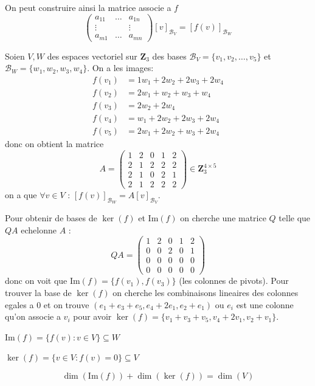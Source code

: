 On peut construire ainsi la matrice associe a $f$
$$
\begin{pmatrix}
a_{11} & \dots & a_{1n} \\
\vdots &  & \vdots \\
a_{m1} & \dots & a_{mn}
\end{pmatrix}[v]_{\mathscr{B}_{V}}=[f(v)]_{\mathscr{B}_{W}}
$$
\begin{example}
Soien $V,W$ des espaces vectoriel sur $\mathbf{Z}_{3}$ des bases $\mathscr{B}_{V}=\{ v_{1},v_{2},\dots,v_{5} \}$ et $\mathscr{B}_{W}=\{ w_{1},w_{2},w_{3},w_{4}\}$. On a les images:
\begin{align*}
f(v_{1}) & =1w_{1}+2w_{2}+2w_{3}+2w_{4} \\
f(v_{2}) & =2w_{1}+w_{2}+w_{3}+w_{4} \\
f(v_{3}) & =2w_{2}+2w_{4}\\
f(v_{4}) & =w_{1}+2w_{2}+2w_{3}+2w_{4} \\
f(v_{5}) & =2w_{1}+2w_{2}+w_{3}+2w_{4}
\end{align*}
donc on obtient la matrice
$$
A=\begin{pmatrix}
1 & 2 & 0 & 1 & 2 \\
2 & 1 & 2 & 2 & 2 \\
2 & 1 & 0 & 2 & 1 \\
2 & 1 & 2 & 2 & 2
\end{pmatrix}\in \mathbf{Z}_{3}^{4\times 5}
$$
on a que $\forall v\in V$ : $[f(v)]_{\mathscr{B}_{W}}=A[v]_{\mathscr{B}_{V}}$.

Pour obtenir de bases de $\ker(f)$ et $\mathrm{Im}(f)$ on cherche une matrice $Q$ telle que $QA$ echelonne $A$ :
$$
QA=\begin{pmatrix}
1 & 2 & 0 & 1 & 2 \\
0 & 0 & 2 & 0 & 1 \\
0 & 0 & 0 & 0 & 0 \\
0 & 0 & 0 & 0 & 0
\end{pmatrix}
$$
donc on voit que $\mathrm{Im}(f)=\{ f(v_{1}),f(v_{3}) \}$ (les colonnes de pivots). Pour trouver la base de $\ker(f)$ on cherche les combinaisons lineaires des colonnes egales a 0 et on trouve $(e_{1}+e_{3}+e_{5},e_{4}+2e_{1},e_{2}+e_{1})$ ou $e_{i}$ est une colonne qu'on associe a $v_{i}$ pour avoir $\ker(f)=\{ v_{1}+v_{3}+v_{5},v_{4}+2v_{1},v_{2}+v_{1} \}$. 
\end{example}
\begin{definition}[Image]
$\mathrm{Im}(f)=\{ f(v):v\in V \}\subseteq W$
\end{definition}
\begin{definition}[Noyau]
$\ker(f)=\{ v\in V:f(v)=0\}\subseteq V$
\end{definition}
\begin{theorem}
$$
\dim(\mathrm{Im}(f))+\dim(\ker(f))=\dim(V)
$$
\end{theorem}

